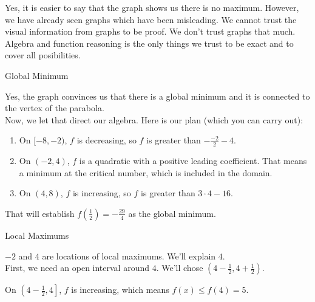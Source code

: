 \documentclass{ximera}
\begin{document}
\begin{exercise}
\begin{question}
\end{question}

\begin{warning}


Yes, it is easier to say that the graph shows us there is no maximum.  However, we have already seen graphs which have been misleading. We cannot trust the visual information from graphs to be proof.  We don't trust graphs that much.  Algebra and function reasoning is the only things we trust to be exact and to cover all posibilities.

\end{warning}






\begin{question} Global Minimum 


Yes, the graph convinces us that there is a global minimum and it is connected to the vertex of the parabola. \\


Now, we let that direct our algebra.  Here is our plan (which you can carry out):


\begin{enumerate}
\item On $[-8, -2)$, $f$ is decreasing, so $f$ is greater than $-\frac{-2}{2} - 4$.
\item On $(-2, 4)$, $f$ is a quadratic with a positive leading coefficient.  That means a minimum at the critical number, which is included in the domain.
\item On $(4, 8)$, $f$ is increasing, so $f$ is greater than $3 \cdot 4 - 16$.
\end{enumerate}

That will establish $f\left( \frac{1}{2} \right) = -\frac{29}{4}$ as the global minimum.

\end{question}










\begin{question} Local Maximums 

$-2$ and $4$ are locations of local maximums.  We'll explain $4$. \\


First, we need an open interval around $4$.  We'll chose $\left( 4-\frac{1}{2}, 4 + \frac{1}{2} \right)$.


On $\left( 4-\frac{1}{2}, 4 \right]$, $f$ is increasing, which means $f(x) \leq f(4) = 5$. \\


\end{question}
\end{exercise}
\end{document}
